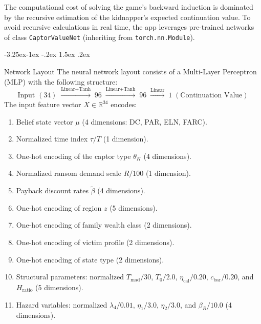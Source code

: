 \documentclass[12pt]{article}
\makeatletter
\newcommand{\pyvar}[1]{\texttt{#1}}
\numberwithin{equation}{section}
\numberwithin{table}{section}
\renewcommand\subsection{\@startsection{subsection}{2}{\z@}%
                                     {-3.25ex\@plus -1ex \@minus -.2ex}%
                                     {1.5ex \@plus .2ex}%
                                     {\normalfont\large\bfseries\raggedright}}
\makeatother
\begin{document}
The computational cost of solving the game's backward induction is dominated by the recursive estimation of the kidnapper's expected continuation value. To avoid recursive calculations in real time, the app leverages pre-trained networks of class \pyvar{CaptorValueNet} (inheriting from \texttt{torch.nn.Module}).

\subsection{Network Layout}
The neural network layout consists of a Multi-Layer Perceptron (MLP) with the following structure:
\begin{equation}
\text{Input } (34) \;\xrightarrow{\text{Linear+Tanh}}\; 96 \;\xrightarrow{\text{Linear+Tanh}}\; 96 \;\xrightarrow{\text{Linear}}\; 1 \; (\text{Continuation Value})
\end{equation}
The input feature vector $X \in \mathbb{R}^{34}$ encodes:
\begin{enumerate}
    \item Belief state vector $\mu$ (4 dimensions: DC, PAR, ELN, FARC).
    \item Normalized time index $\tau / T$ (1 dimension).
    \item One-hot encoding of the captor type $\theta_K$ (4 dimensions).
    \item Normalized ransom demand scale $R / 100$ (1 dimension).
    \item Payback discount rates $\tilde{\beta}$ (4 dimensions).
    \item One-hot encoding of region $z$ (5 dimensions).
    \item One-hot encoding of family wealth class (2 dimensions).
    \item One-hot encoding of victim profile (2 dimensions).
    \item One-hot encoding of state type (2 dimensions).
    \item Structural parameters: normalized $T_{\text{mad}} / 30$, $T_0 / 2.0$, $\eta_{\text{cal}} / 0.20$, $c_{\text{bar}} / 0.20$, and $H_{\text{ratio}}$ (5 dimensions).
    \item Hazard variables: normalized $\lambda_4 / 0.01$, $\eta_1 / 3.0$, $\eta_2 / 3.0$, and $\beta_R / 10.0$ (4 dimensions).
\end{enumerate}
\end{document}
